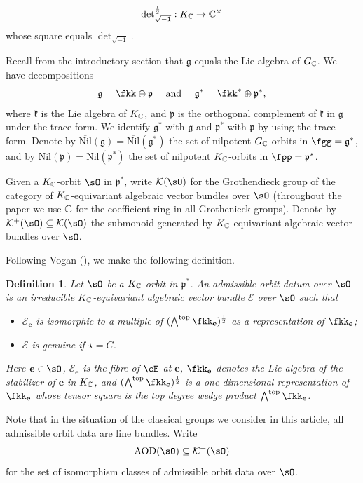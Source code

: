 \documentclass[11pt,a4paper]{amsart}
\newcommand{\CE}{{\mathcal {E}}}
\newcommand{\CK}{{\mathcal {K}}}
\newcommand{\g}{\mathfrak g}
\newcommand{\p}{\mathfrak p}
\newcommand{\be}{\begin {equation}}
\newcommand{\ee}{\end {equation}}
\numberwithin{equation}{section}
\newtheorem{defn}[thm]{Definition}
\theoremstyle{remark}
\def\subset{\subseteq}
\def\Nil{\overline{\mathrm{Nil}}}
\begin{document}
\be\label{dethalf}
{\det}_{\sqrt{-1}}^{\frac{1}{2}}:  K_{\C}\rightarrow \C^\times 
\ee
whose square equals $\det_{\sqrt{-1}}$.


Recall from the introductory section that $\g$ equals  the Lie algebra of $G_{\mathbb{C}}$. 
We have  decompositions
\[
\g=\fkk \oplus \p
\quad \text{ and } \quad
\g^*=\fkk^*\oplus \p^*,
\]
where $\mathfrak k$ is the Lie algebra of $K_{\mathbb{C}}$, and $\p$ is the orthogonal complement of $\mathfrak k$ in $\g$ under the trace form.
We identify $\g^*$ with $\g$ and $\p^*$ with $\p$ by using the trace form. 
Denote by $\Nil(\g)=\Nil(\g^*)$ the set of nilpotent $G_{\mathbb{C}}$-orbits in $\fgg=\g^*$, and by
$\Nil(\p)=\Nil(\p^*)$ the set of nilpotent $K_{\mathbb{C}}$-orbits in $\fpp=\p^*$.

Given a $K_{\mathbb{C}}$-orbit $\sO$ in $\p^*$, write $\CK(\sO)$ for the Grothendieck group of the category of
$K_{\mathbb{C}}$-equivariant algebraic vector bundles  over $\sO$ (throughout the paper we use $\mathbb{C}$ for the coefficient ring in all Grothenieck groups). Denote by $\CK^+(\sO)\subset \CK(\sO)$ the submonoid generated by $K_{\mathbb{C}}$-equivariant algebraic vector bundles over $\sO$. 

Following Vogan (\cite[Definition 7.13]{Vo89}), we make the following definition.
\begin{defn}\label{defaod}
  Let $\sO$ be a $K_{\mathbb{C}}$-orbit in $\p^*$. An admissible orbit datum over
  $\sO$ is an irreducible $K_{\mathbb{C}}$-equivariant algebraic vector bundle $\CE$
  over $\sO$ such that
  \begin{itemize}
    \item $\CE_\mathbf e$ is isomorphic to a multiple of
    $(\bigwedge^{\mathrm{top}} \fkk_\mathbf e )^{\frac{1}{2}}$ as a representation of
    $\fkk_\mathbf e$;
    \item $\CE$ is genuine if $\star=\widetilde C$.
  \end{itemize}
  Here $\mathbf e\in \sO$, $\CE_\mathbf e$ is the fibre of $\cE$ at $\mathbf e$, $\fkk_\mathbf e$
  denotes the Lie algebra of the stabilizer of $\mathbf e$ in $K_{\mathbb{C}}$, and
  $(\bigwedge^{\mathrm{top}} \fkk_\mathbf e)^{\frac{1}{2}}$ is a one-dimensional
  representation of $\fkk_\mathbf e$ whose tensor square is the top degree wedge
  product $\bigwedge^{\mathrm{top}} \fkk_\mathbf e$.
\end{defn}
Note that in the situation of the classical groups we consider in this article, all admissible
orbit data are line bundles.  
Write
\[
\mathrm{AOD}(\sO)\subset \CK^+(\sO)
\]
for the set of isomorphism classes of admissible orbit data over $\sO$.
\end{document}
